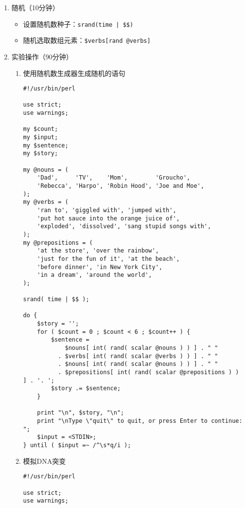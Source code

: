 \documentclass{TIJMUjiaoanSY}
\begin{document}
\firstTail

\newpage
\otherHeader

\begin{enumerate}
  \item 随机（10分钟）
    \begin{itemize}
      \item 设置随机数种子：\verb=srand(time | $$)=
      \item 随机选取数组元素：\verb|$verbs[rand @verbs]|
    \end{itemize}
  \item 实验操作（90分钟）
    \begin{enumerate}
      \item 使用随机数生成器生成随机的语句
\begin{verbatim}
#!/usr/bin/perl

use strict;
use warnings;

my $count;
my $input;
my $sentence;
my $story;

my @nouns = (
    'Dad',     'TV',    'Mom',        'Groucho',
    'Rebecca', 'Harpo', 'Robin Hood', 'Joe and Moe',
);
my @verbs = (
    'ran to', 'giggled with', 'jumped with',
    'put hot sauce into the orange juice of',
    'exploded', 'dissolved', 'sang stupid songs with',
);
my @prepositions = (
    'at the store', 'over the rainbow',
    'just for the fun of it', 'at the beach',
    'before dinner', 'in New York City',
    'in a dream', 'around the world',
);

srand( time | $$ );

do {
    $story = '';
    for ( $count = 0 ; $count < 6 ; $count++ ) {
        $sentence =
            $nouns[ int( rand( scalar @nouns ) ) ] . " "
          . $verbs[ int( rand( scalar @verbs ) ) ] . " "
          . $nouns[ int( rand( scalar @nouns ) ) ] . " "
          . $prepositions[ int( rand( scalar @prepositions ) ) ] . '. ';
        $story .= $sentence;
    }

    print "\n", $story, "\n";
    print "\nType \"quit\" to quit, or press Enter to continue: ";
    $input = <STDIN>;
} until ( $input =~ /^\s*q/i );

\end{verbatim}

\otherTail
\newpage
\otherHeader

      \item 模拟DNA突变
\begin{verbatim}
#!/usr/bin/perl

use strict;
use warnings;


\end{verbatim}
\end{enumerate}
\end{enumerate}
\end{document}
